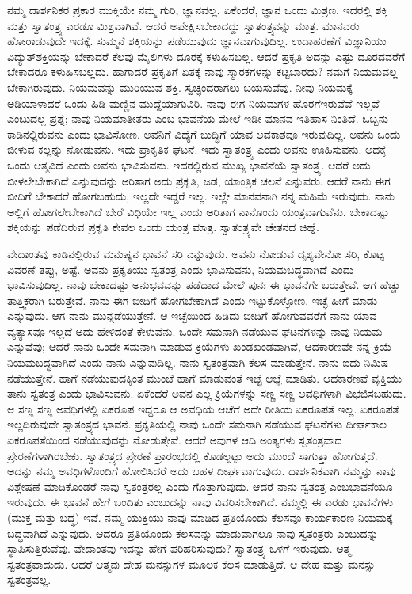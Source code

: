 \vskip 6pt

ನಮ್ಮ ದಾರ್ಶನಿಕರ ಪ್ರಕಾರ ಮುಕ್ತಿಯೇ ನಮ್ಮ ಗುರಿ, ಜ್ಞಾನವಲ್ಲ. ಏಕೆಂದರೆ, ಜ್ಞಾನ ಒಂದು ಮಿಶ್ರಣ. ಇದರಲ್ಲಿ ಶಕ್ತಿ ಮತ್ತು ಸ್ವಾತಂತ್ರ್ಯ ಎರಡೂ ಮಿಶ್ರವಾಗಿವೆ. ಆದರೆ ಅಪೇಕ್ಷಿಸಬೇಕಾದದ್ದು ಸ್ವಾತಂತ್ರ್ಯವನ್ನು ಮಾತ್ರ. ಮಾನವರು ಹೋರಾಡುವುದೇ ಇದಕ್ಕೆ. ಸುಮ್ಮನೆ ಶಕ್ತಿಯನ್ನು ಪಡೆಯುವುದು ಜ್ಞಾನವಾಗುವುದಿಲ್ಲ. ಉದಾಹರಣೆಗೆ ವಿಜ್ಞಾನಿಯು ವಿದ್ಯುತ್​ಶಕ್ತಿಯನ್ನು ಬೇಕಾದರೆ ಕೆಲವು ಮೈಲಿಗಳು ದೂರಕ್ಕೆ ಕಳುಹಿಸಬಲ್ಲ. ಆದರೆ ಪ್ರಕೃತಿ ಅದನ್ನು ಎಷ್ಟು ದೂರದವರೆಗೆ ಬೇಕಾದರೂ ಕಳುಹಿಸಬಲ್ಲದು. ಹಾಗಾದರೆ ಪ್ರಕೃತಿಗೆ ಏತಕ್ಕೆ ನಾವು ಸ್ಮಾರಕಗಳನ್ನು ಕಟ್ಟಬಾರದು? ನಮಗೆ ನಿಯಮವಲ್ಲ ಬೇಕಾಗಿರುವುದು. ನಿಯಮವನ್ನು ಮುರಿಯುವ ಶಕ್ತಿ. ಸ್ವಚ್ಛಂದರಾಗಲು ಬಯಸುವೆವು. ನೀವು ನಿಯಮಕ್ಕೆ ಅಡಿಯಾಳಾದರೆ ಒಂದು ಹಿಡಿ ಮಣ್ಣಿನ ಮುದ್ದೆಯಾಗುವಿರಿ. ನಾವು ಈಗ ನಿಯಮಗಳ ಹೊರಗೆ\break ಇರುವೆವೆ ಇಲ್ಲವೆ ಎಂಬುದಲ್ಲ ಪ್ರಶ್ನೆ; ನಾವು ನಿಯಮಾತೀತರು ಎಂಬ ಭಾವನೆಯ ಮೇಲೆ ಇಡೀ ಮಾನವ ಇತಿಹಾಸ ನಿಂತಿದೆ. ಒಬ್ಬನು ಕಾಡಿನಲ್ಲಿರುವನು ಎಂದು ಭಾವಿಸೋಣ. ಅವನಿಗೆ ವಿದ್ಯೆಗೆ ಬುದ್ಧಿಗೆ ಯಾವ ಅವಕಾಶವೂ ಇರುವುದಿಲ್ಲ. ಅವನು ಒಂದು ಬೀಳುವ ಕಲ್ಲನ್ನು ನೋಡುವನು. ಇದು ಪ್ರಾಕೃತಿಕ ಘಟನೆ. ಇದು ಸ್ವಾತಂತ್ರ್ಯ ಎಂದು ಅವನು ಊಹಿಸುವನು. ಅದಕ್ಕೆ ಒಂದು ಆತ್ಮವಿದೆ ಎಂದು ಅವನು ಭಾವಿಸುವನು. ಇದರಲ್ಲಿರುವ ಮುಖ್ಯ ಭಾವನೆಯೆ ಸ್ವಾತಂತ್ರ್ಯ. ಆದರೆ ಅದು ಬೀಳಲೇಬೇಕಾಗಿದೆ ಎನ್ನುವುದನ್ನು ಅರಿತಾಗ ಅದು ಪ್ರಕೃತಿ, ಜಡ, ಯಾಂತ್ರಿಕ ಚಲನೆ ಎನ್ನುವರು. ಆದರೆ ನಾನು ಈಗ ಬೀದಿಗೆ ಬೇಕಾದರೆ ಹೋಗಬಹುದು, ಇಲ್ಲದೇ ಇದ್ದರೆ ಇಲ್ಲ. ಇಲ್ಲೇ ಮಾನವನಾಗಿ ನನ್ನ ಮಹಿಮೆ ಇರುವುದು. ನಾನು ಅಲ್ಲಿಗೆ ಹೋಗಲೇಬೇಕಾಗಿದೆ ಬೇರೆ ವಿಧಿಯೇ ಇಲ್ಲ ಎಂದು ಅರಿತಾಗ ನಾನೊಂದು ಯಂತ್ರವಾಗುವೆನು. ಬೇಕಾದಷ್ಟು ಶಕ್ತಿಯನ್ನು ಪಡೆದಿರುವ ಪ್ರಕೃತಿ ಕೇವಲ ಒಂದು ಯಂತ್ರ ಮಾತ್ರ. ಸ್ವಾತಂತ್ರ್ಯವೇ ಚೇತನದ ಚಿಹ್ನೆ.

\vskip 6pt

ವೇದಾಂತವು ಕಾಡಿನಲ್ಲಿರುವ ಮನುಷ್ಯನ ಭಾವನೆ ಸರಿ ಎನ್ನುವುದು. ಅವನು ನೋಡುವ ದೃಶ್ಯವೇನೋ ಸರಿ, ಕೊಟ್ಟ ವಿವರಣೆ ತಪ್ಪು, ಅಷ್ಟೆ. ಅವನು ಪ್ರಕೃತಿಯು ಸ್ವತಂತ್ರ ಎಂದು ಭಾವಿಸುವನು, ನಿಯಮಬದ್ಧವಾಗಿದೆ ಎಂದು ಭಾವಿಸುವುದಿಲ್ಲ. ನಾವು ಬೇಕಾದಷ್ಟು ಅನುಭವವನ್ನು ಪಡೆದಾದ ಮೇಲೆ ಪುನಃ ಈ ಭಾವನೆಗೇ ಬರುತ್ತೇವೆ. ಆಗ ಹೆಚ್ಚು ತಾತ್ತ್ವಿಕರಾಗಿ ಬರುತ್ತೇವೆ. ನಾನು ಈಗ ಬೀದಿಗೆ ಹೋಗಬೇಕಾಗಿದೆ ಎಂದು ಇಟ್ಟುಕೊಳ್ಳೋಣ. ಇಚ್ಛೆ ಹೀಗೆ ಮಾಡು ಎನ್ನುವುದು. ಆಗ ನಾನು ಮುನ್ನಡೆಯುತ್ತೇನೆ. ಆ ಇಚ್ಛೆಯಿಂದ ಹಿಡಿದು ಬೀದಿಗೆ ಹೋಗುವವರೆಗೆ ನಾನು ಯಾವ ವ್ಯತ್ಯಾಸವೂ ಇಲ್ಲದೆ ಅದು ಹೇಳಿದಂತೆ ಕೇಳುವೆನು. ಒಂದೇ ಸಮನಾಗಿ ನಡೆಯುವ ಘಟನೆಗಳನ್ನು ನಾವು ನಿಯಮ ಎನ್ನುವೆವು; ಆದರೆ ನಾನು ಒಂದೇ ಸಮನಾಗಿ ಮಾಡುವ ಕ್ರಿಯೆಗಳು ಖಂಡಖಂಡವಾಗಿವೆ, ಆದಕಾರಣವೇ ನನ್ನ ಕ್ರಿಯೆ ನಿಯಮಬದ್ಧವಾಗಿದೆ ಎಂದು ನಾನು ಎನ್ನುವುದಿಲ್ಲ. ನಾನು ಸ್ವತಂತ್ರವಾಗಿ ಕೆಲಸ ಮಾಡುತ್ತೇನೆ. ನಾನು ಐದು ನಿಮಿಷ ನಡೆಯುತ್ತೇನೆ. ಹಾಗೆ ನಡೆಯುವುದಕ್ಕಿಂತ ಮುಂಚೆ ಹಾಗೆ ಮಾಡುವಂತೆ ಇಚ್ಛೆ ಆಜ್ಞೆ ಮಾಡಿತು. ಆದಕಾರಣವೆ ವ್ಯಕ್ತಿಯು ತಾನು ಸ್ವತಂತ್ರ ಎಂದು ಭಾವಿಸುವನು. ಏಕೆಂದರೆ ಅವನ ಎಲ್ಲ ಕ್ರಿಯೆಗಳನ್ನು ಸಣ್ಣ ಸಣ್ಣ ಅವಧಿಗಳಾಗಿ ವಿಭಜಿಸಬಹುದು. ಆ ಸಣ್ಣ ಸಣ್ಣ ಅವಧಿಗಳಲ್ಲಿ ಏಕರೂಪ ಇದ್ದರೂ ಆ ಅವಧಿಯ ಆಚೆಗೆ ಅದೇ ರೀತಿಯ ಏಕರೂಪತೆ ಇಲ್ಲ. ಏಕರೂಪತೆ ಇಲ್ಲದಿರುವುದೇ ಸ್ವಾತಂತ್ರ್ಯದ ಭಾವನೆ. ಪ್ರಕೃತಿಯಲ್ಲಿ ನಾವು ಒಂದೇ ಸಮನಾಗಿ ನಡೆಯುವ ಘಟನೆಗಳು ದೀರ್ಘಕಾಲ ಏಕರೂಪತೆಯಿಂದ ನಡೆಯುವುದನ್ನು ನೋಡುತ್ತೇವೆ. ಆದರೆ ಅವುಗಳ ಆದಿ ಅಂತ್ಯಗಳು ಸ್ವತಂತ್ರವಾದ ಪ್ರೇರಣೆಗಳಾಗಿರಬೇಕು. ಸ್ವಾತಂತ್ರ್ಯದ ಪ್ರೇರಣೆ ಪ್ರಾರಂಭದಲ್ಲಿ ಕೊಡಲ್ಪಟ್ಟು ಅದು ಮುಂದೆ ಸಾಗುತ್ತಾ ಹೋಗುತ್ತದೆ. ಅದನ್ನು ನಮ್ಮ ಅವಧಿಗಳೊಂದಿಗೆ ಹೋಲಿಸಿದರೆ ಅದು ಬಹಳ ದೀರ್ಘವಾಗುವುದು. ದಾರ್ಶನಿಕವಾಗಿ ನಮ್ಮನ್ನು ನಾವು ವಿಶ್ಲೇಷಣೆ ಮಾಡಿಕೊಂಡರೆ ನಾವು ಸ್ವತಂತ್ರರಲ್ಲ ಎಂದು ಗೊತ್ತಾಗುವುದು. ಆದರೆ ನಾನು ಸ್ವತಂತ್ರ ಎಂಬ\break ಭಾವನೆಯೂ ಇರುವುದು. ಈ ಭಾವನೆ ಹೇಗೆ ಬಂದಿತು ಎಂಬುದನ್ನು ನಾವು ವಿವರಿಸಬೇಕಾಗಿದೆ. ನಮ್ಮಲ್ಲಿ ಈ ಎರಡು ಭಾವನೆಗಳು (ಮುಕ್ತ ಮತ್ತು ಬದ್ಧ) ಇವೆ. ನಮ್ಮ ಯುಕ್ತಿಯು ನಾವು ಮಾಡಿದ ಪ್ರತಿಯೊಂದು ಕೆಲಸವೂ ಕಾರ್ಯಕಾರಣ ನಿಯಮಕ್ಕೆ ಬದ್ಧವಾಗಿದೆ ಎನ್ನುವುದು. ಆದರೂ ಪ್ರತಿಯೊಂದು ಕೆಲಸವನ್ನು ಮಾಡುವಾಗಲೂ ನಾವು ಸ್ವತಂತ್ರರು ಎಂಬುದನ್ನು ಸ್ಥಾಪಿಸುತ್ತಿರುವೆವು. ವೇದಾಂತವು ಇದನ್ನು ಹೇಗೆ ಪರಿಹರಿಸುವುದು? ಸ್ವಾತಂತ್ರ್ಯ ಒಳಗೆ ಇರುವುದು. ಆತ್ಮ ಸ್ವತಂತ್ರವಾದುದು. ಆದರೆ ಆತ್ಮವು ದೇಹ ಮನಸ್ಸುಗಳ ಮೂಲಕ ಕೆಲಸ ಮಾಡುತ್ತಿದೆ. ಆ ದೇಹ ಮತ್ತು ಮನಸ್ಸು ಸ್ವತಂತ್ರವಲ್ಲ.

